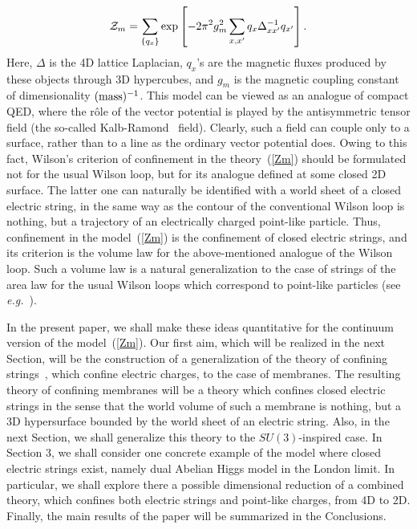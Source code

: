 \documentclass[a4paper,12pt]{article}
\begin{document}
\begin{equation}
\label{Zm}
{\cal Z}_m=\sum\limits_{\{q_x\}}^{}\exp\left[-2\pi^2g_m^2\sum\limits_{x,x'}^{}q_x\Delta^{-1}_{xx'}q_{x'}\right].
\end{equation}
Here, $\Delta$ is the 4D lattice Laplacian, $q_x$'s are the magnetic fluxes produced by these objects through 
3D hypercubes, and $g_m$ is the magnetic coupling constant of dimensionality 
$({\rm mass})^{-1}$. This model can be viewed as an analogue of compact QED, where the r\^ole of the vector 
potential is played by the antisymmetric tensor field (the so-called Kalb-Ramond~\cite{3} field). Clearly, such a 
field can couple only to a surface, rather than to a line as the ordinary vector potential does. Owing to this fact,
Wilson's criterion of confinement in the theory~(\ref{Zm}) should be formulated not for the usual Wilson loop, but for its analogue
defined at some closed 2D surface. The latter one can naturally be identified with a world sheet of a closed 
electric string, in the same way as the contour of the conventional Wilson loop is nothing, but a trajectory 
of an electrically charged point-like particle. Thus, confinement in the model~(\ref{Zm}) is
the confinement of closed electric strings, and its criterion is the volume law for the above-mentioned analogue of the 
Wilson loop. Such a volume law is a natural generalization to the case of strings
of the area law for the usual Wilson loops which correspond to point-like particles (see {\it e.g.}~\cite{dia}).

In the present paper, we shall make these ideas quantitative for the continuum version of the model~(\ref{Zm}). 
Our first aim, which will be realized in the next Section, will be the construction of a generalization 
of the theory of confining strings~\cite{2}, which confine electric charges, 
to the case of membranes. The resulting theory of confining membranes will be a theory which confines 
closed electric strings in the sense that the world volume of such a membrane is nothing, but a 3D hypersurface bounded by the 
world sheet of an electric string. Also, in the next Section, we shall generalize this theory to the $SU(3)$-inspired case.
In Section 3, we shall consider one concrete example of the model where closed electric strings exist, namely dual
Abelian Higgs model in the London limit. In particular, we shall explore there a possible dimensional reduction of a 
combined theory, which confines both electric strings and point-like charges, from 4D to 2D. Finally, the main results of the 
paper will be summarized in the Conclusions.
\end{document}
